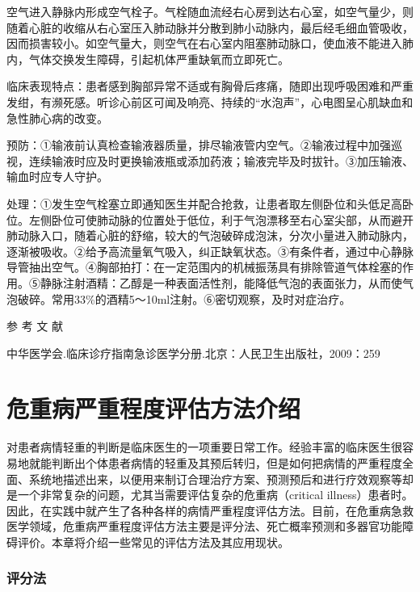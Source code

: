 空气进入静脉内形成空气栓子。气栓随血流经右心房到达右心室，如空气量少，则随着心脏的收缩从右心室压入肺动脉并分散到肺小动脉内，最后经毛细血管吸收，因而损害较小。如空气量大，则空气在右心室内阻塞肺动脉口，使血液不能进入肺内，气体交换发生障碍，引起机体严重缺氧而立即死亡。

临床表现特点：患者感到胸部异常不适或有胸骨后疼痛，随即出现呼吸困难和严重发绀，有濒死感。听诊心前区可闻及响亮、持续的“水泡声”，心电图呈心肌缺血和急性肺心病的改变。

预防：①输液前认真检查输液器质量，排尽输液管内空气。②输液过程中加强巡视，连续输液时应及时更换输液瓶或添加药液；输液完毕及时拔针。③加压输液、输血时应专人守护。

处理：①发生空气栓塞立即通知医生并配合抢救，让患者取左侧卧位和头低足高卧位。左侧卧位可使肺动脉的位置处于低位，利于气泡漂移至右心室尖部，从而避开肺动脉入口，随着心脏的舒缩，较大的气泡破碎成泡沫，分次小量进入肺动脉内，逐渐被吸收。②给予高流量氧气吸入，纠正缺氧状态。③有条件者，通过中心静脉导管抽出空气。④胸部拍打：在一定范围内的机械振荡具有排除管道气体栓塞的作用。⑤静脉注射酒精：乙醇是一种表面活性剂，能降低气泡的表面张力，从而使气泡破碎。常用33\%的酒精5～10ml注射。⑥密切观察，及时对症治疗。

\protect\hypertarget{text00400.html}{}{}

\hypertarget{text00400.htmlux5cux23CHP16-13-9}{}
参 考 文 献

中华医学会.临床诊疗指南急诊医学分册.北京：人民卫生出版社，2009：259

\protect\hypertarget{text00401.html}{}{}

\chapter{危重病严重程度评估方法介绍}

对患者病情轻重的判断是临床医生的一项重要日常工作。经验丰富的临床医生很容易地就能判断出个体患者病情的轻重及其预后转归，但是如何把病情的严重程度全面、系统地描述出来，以便用来制订合理治疗方案、预测预后和进行疗效观察等却是一个非常复杂的问题，尤其当需要评估复杂的危重病（critical
illness）患者时。因此，在实践中就产生了各种各样的病情严重程度评估方法。目前，在危重病急救医学领域，危重病严重程度评估方法主要是评分法、死亡概率预测和多器官功能障碍评价。本章将介绍一些常见的评估方法及其应用现状。

\subsection{评分法}

